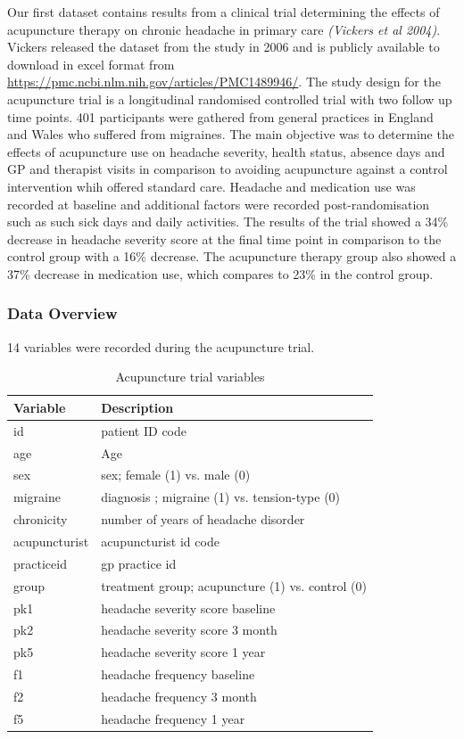 \documentclass{article}
\begin{document}
Our first dataset contains results from a clinical trial determining the
effects of acupuncture therapy on chronic headache in primary care
\emph{(Vickers et al 2004)}. Vickers released the dataset from the study
in 2006 and is publicly available to download in excel format from
\url{https://pmc.ncbi.nlm.nih.gov/articles/PMC1489946/}. The study
design for the acupuncture trial is a longitudinal randomised controlled
trial with two follow up time points. 401 participants were gathered
from general practices in England and Wales who suffered from migraines.
The main objective was to determine the effects of acupuncture use on
headache severity, health status, absence days and GP and therapist
visits in comparison to avoiding acupuncture against a control
intervention whih offered standard care. Headache and medication use was
recorded at baseline and additional factors were recorded
post-randomisation such as such sick days and daily activities. The
results of the trial showed a 34\% decrease in headache severity score
at the final time point in comparison to the control group with a 16\%
decrease. The acupuncture therapy group also showed a 37\% decrease in
medication use, which compares to 23\% in the control group.

\subsubsection{Data Overview}\label{data-overview}

14 variables were recorded during the acupuncture trial.

\begin{table}[H]
\centering
\caption{Acupuncture trial variables}
\label{}

\begin{tabular}{ll}
\toprule
Variable & Description\\
\midrule
id & patient ID code\\
age & Age\\
sex & sex; female (1) vs. male (0)\\
migraine & diagnosis ; migraine (1) vs. tension-type (0)\\
chronicity & number of years of headache disorder\\
\addlinespace
acupuncturist & acupuncturist id code\\
practiceid & gp practice id\\
group & treatment group; acupuncture (1) vs. control (0)\\
pk1 & headache severity score baseline\\
pk2 & headache severity score 3 month\\
\addlinespace
pk5 & headache severity score 1 year\\
f1 & headache frequency baseline\\
f2 & headache frequency 3 month\\
f5 & headache frequency 1 year\\
\bottomrule
\end{tabular}
\end{table}
\end{document}
